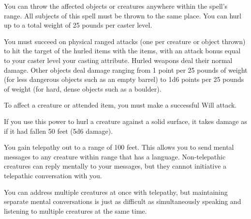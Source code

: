 \spellrng{\rngmed}
\begin{spelleffect}
  You can throw the affected objects or creatures anywhere within the spell's range. All subjects of this spell must be thrown to the same place. You can hurl up to a total weight of 25 pounds per caster level.
  \par You must succeed on physical ranged attacks (one per creature or object thrown) to hit the target of the hurled items with the items, with an attack bonus equal to your caster level \add your casting attribute. Hurled weapons deal their normal damage. Other objects deal damage ranging from 1 point per 25 pounds of weight (for less dangerous objects such as an empty barrel) to 1d6 points per 25 pounds of weight (for hard, dense objects such as a boulder).
  \par To affect a creature or attended item, you must make a successful Will attack.
  \par If you use this power to hurl a creature against a solid surface, it takes damage as if it had fallen 50 feet (5d6 damage).
\end{spelleffect}

\spelldur{\durlong}
\begin{spelleffect}
    You gain telepathy out to a range of 100 feet. This allows you to send mental messages to any creature within range that has a language. Non-telepathic creatures can reply mentally to your messages, but they cannot initiative a telepathic conversation with you.

    You can address multiple creatures at once with telepathy, but maintaining separate mental conversations is just as difficult as simultaneously speaking and listening to multiple creatures at the same time. 
\end{spelleffect}

